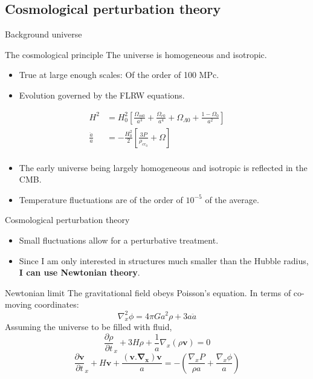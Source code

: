 \documentclass{beamer}
\begin{document}
\subsection{Cosmological perturbation theory}
\begin{frame}{Background universe}
	\begin{block}{The cosmological principle}
		The universe is homogeneous and isotropic.
	\end{block}
	\begin{itemize}
		\item True at large enough scales: Of the order of 100 MPc.
		\item Evolution governed by the FLRW equations.
	\end{itemize}
	\begin{equation}
	\begin{aligned}
	H^2&=H_0^2\left[\frac{\Omega_{m0}}{a^3}+
	\frac{{\Omega}_{r0}}{a^4}+
	{\Omega}_{\Lambda 0}+
	\frac{1-\Omega_0}{a^2}\right]\\
	\frac{\ddot{a}}{a}&=-\frac{H_0^2}{2}[\frac{3P}{\rho_{cr_0}}+\Omega]\\
	\end{aligned}
	\end{equation}
	\begin{itemize}
		\item The early universe being largely homogeneous and isotropic is reflected in the CMB.
		\item Temperature fluctuations are of the order of $10^{-5}$ of the average.
	\end{itemize}
\end{frame}
\begin{frame}{Cosmological perturbation theory}
	\begin{itemize}
		\item Small fluctuations allow for a perturbative treatment.
		\item Since I am only interested in structures much smaller than the Hubble radius, \textbf{I can use Newtonian theory}.
	\end{itemize}
	\begin{block}{Newtonian limit}
		The gravitational field obeys Poisson's equation. In terms of co-moving coordinates:
		\begin{equation}
		\nabla_x^2\phi=4\pi Ga^2\rho+3a\ddot{a}
		\end{equation}
		Assuming the universe to be filled with fluid,
		\begin{equation}
		\tag{continuity eqn.}
		\frac{\partial\rho}{\partial t}_x +3H\rho+\frac{1}{a}\nabla_x(\rho\mathbf{v})=0
		\end{equation}
		\begin{equation}
		\tag{Euler eqn.}
		\frac{\partial \mathbf{v}}{\partial t}_x +H\mathbf{v}+\frac{\mathbf{(v.\nabla_x)}\mathbf{v}}{a}=-\left(\frac{\nabla_xP}{\rho a}+\frac{\nabla_x\phi}{a}\right)
		\end{equation}
	\end{block}
\end{frame}
\end{document}
